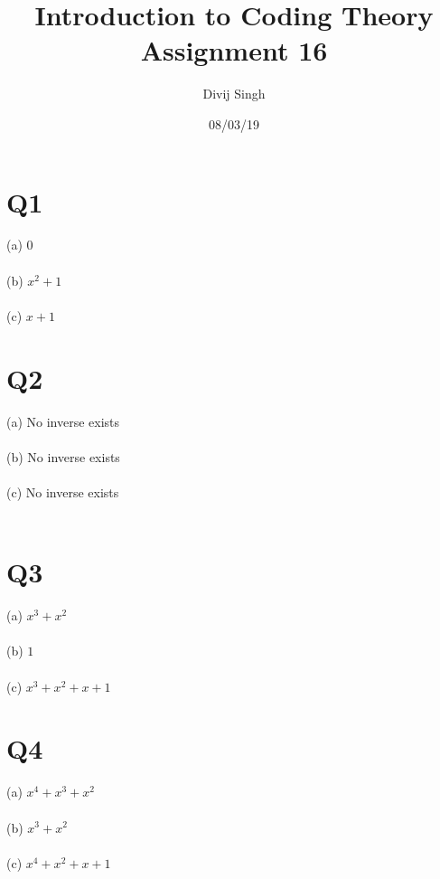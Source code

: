 \documentclass{article}
\title{Introduction to Coding Theory Assignment 16}
\author{Divij Singh}
\date{08/03/19}
\begin{document}
	\maketitle
	
	\section{Q1}
	(a) 0\\\\
(b) $x^2 +1$\\\\
(c) $x+1$

\section{Q2}
(a) No inverse exists\\\\
(b) No inverse exists\\\\
(c) No inverse exists\\\\
\section{Q3}
(a) $x^3 + x^2$\\\\
(b) $1$\\\\
(c) $x^3 + x^2 + x +1$
\section{Q4}
(a) $x^4 + x^3 + x^2$\\\\
(b) $x^3 + x^2$\\\\
(c) $x^4 + x^2 + x + 1$
\end{document}
